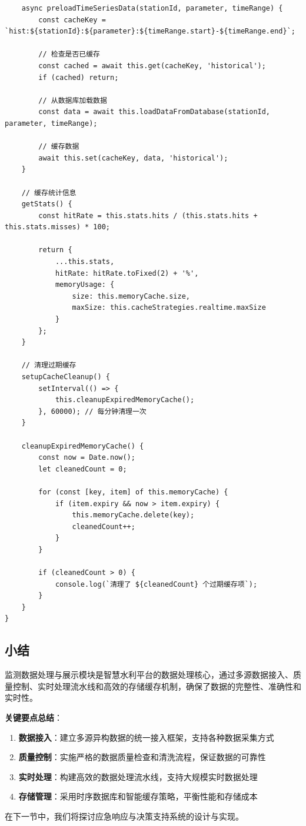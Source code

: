 \begin{lstlisting}
    async preloadTimeSeriesData(stationId, parameter, timeRange) {
        const cacheKey = `hist:${stationId}:${parameter}:${timeRange.start}-${timeRange.end}`;
        
        // 检查是否已缓存
        const cached = await this.get(cacheKey, 'historical');
        if (cached) return;
        
        // 从数据库加载数据
        const data = await this.loadDataFromDatabase(stationId, parameter, timeRange);
        
        // 缓存数据
        await this.set(cacheKey, data, 'historical');
    }
    
    // 缓存统计信息
    getStats() {
        const hitRate = this.stats.hits / (this.stats.hits + this.stats.misses) * 100;
        
        return {
            ...this.stats,
            hitRate: hitRate.toFixed(2) + '%',
            memoryUsage: {
                size: this.memoryCache.size,
                maxSize: this.cacheStrategies.realtime.maxSize
            }
        };
    }
    
    // 清理过期缓存
    setupCacheCleanup() {
        setInterval(() => {
            this.cleanupExpiredMemoryCache();
        }, 60000); // 每分钟清理一次
    }
    
    cleanupExpiredMemoryCache() {
        const now = Date.now();
        let cleanedCount = 0;
        
        for (const [key, item] of this.memoryCache) {
            if (item.expiry && now > item.expiry) {
                this.memoryCache.delete(key);
                cleanedCount++;
            }
        }
        
        if (cleanedCount > 0) {
            console.log(`清理了 ${cleanedCount} 个过期缓存项`);
        }
    }
}
\end{lstlisting}

\subsection{小结}\label{ux5c0fux7ed3}

监测数据处理与展示模块是智慧水利平台的数据处理核心，通过多源数据接入、质量控制、实时处理流水线和高效的存储缓存机制，确保了数据的完整性、准确性和实时性。

\textbf{关键要点总结}：

\begin{enumerate}
\def\labelenumi{\arabic{enumi}.}
\item
  \textbf{数据接入}：建立多源异构数据的统一接入框架，支持各种数据采集方式
\item
  \textbf{质量控制}：实施严格的数据质量检查和清洗流程，保证数据的可靠性
\item
  \textbf{实时处理}：构建高效的数据处理流水线，支持大规模实时数据处理
\item
  \textbf{存储管理}：采用时序数据库和智能缓存策略，平衡性能和存储成本
\end{enumerate}

在下一节中，我们将探讨应急响应与决策支持系统的设计与实现。
